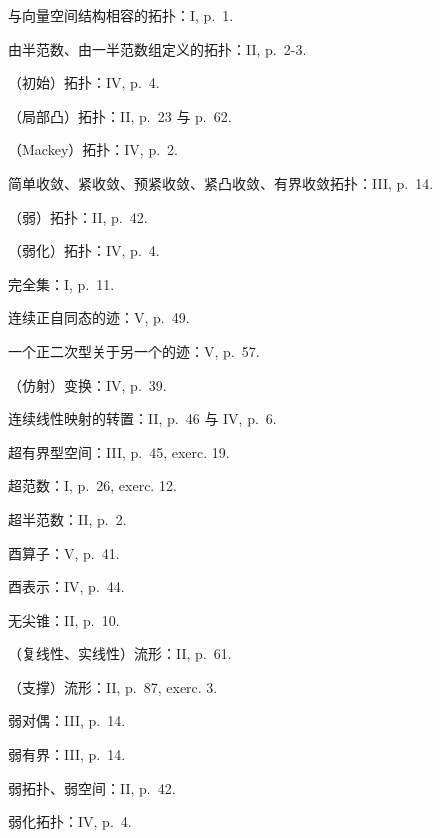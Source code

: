 与向量空间结构相容的拓扑：I, p.~1.

由半范数、由一半范数组定义的拓扑：II, p.~2-3.

（初始）拓扑：IV, p.~4.

（局部凸）拓扑：II, p.~23 与 p.~62.

（Mackey）拓扑：IV, p.~2.

简单收敛、紧收敛、预紧收敛、紧凸收敛、有界收敛拓扑：III, p.~14.

（弱）拓扑：II, p.~42.

（弱化）拓扑：IV, p.~4.

完全集：I, p.~11.

连续正自同态的迹：V, p.~49.

一个正二次型关于另一个的迹：V, p.~57.

（仿射）变换：IV, p.~39.

连续线性映射的转置：II, p.~46 与 IV, p.~6.

超有界型空间：III, p.~45, exerc. 19.

超范数：I, p.~26, exerc. 12.

超半范数：II, p.~2.

酉算子：V, p.~41.

酉表示：IV, p.~44.

无尖锥：II, p.~10.

（复线性、实线性）流形：II, p.~61.

（支撑）流形：II, p.~87, exerc. 3.

弱对偶：III, p.~14.

弱有界：III, p.~14.

弱拓扑、弱空间：II, p.~42.

弱化拓扑：IV, p.~4.


